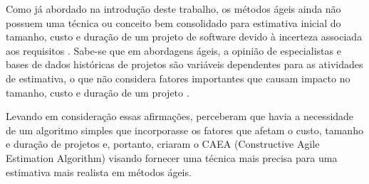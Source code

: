 Como já abordado na introdução deste trabalho, os métodos ágeis ainda não possuem uma técnica ou conceito bem consolidado
para estimativa inicial do tamanho, custo e duração de um projeto de software devido à incerteza associada aos requisitos \cite{bhalerao09}. 
Sabe-se que em abordagens ágeis, a opinião de especialistas e bases de dados históricas de projetos são variáveis 
dependentes para as atividades de estimativa, o que não considera fatores importantes que causam impacto no tamanho, custo e duração 
de um projeto \cite{bhalerao09}. 

Levando em consideração essas afirmações,  perceberam que havia a necessidade de um algoritmo simples que
incorporasse os fatores que afetam o custo, tamanho e duração de projetos e, portanto, criaram o CAEA 
(Constructive Agile Estimation Algorithm) visando fornecer uma técnica mais precisa para uma estimativa mais realista
em métodos ágeis.

